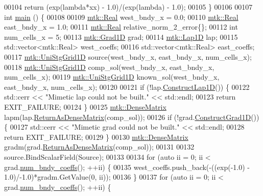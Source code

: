 \begin{DoxyCode}
00104   \textcolor{keywordflow}{return} (exp(lambda*xx) - 1.0)/(exp(lambda) - 1.0);
00105 \}
00106 
00107 \textcolor{keywordtype}{int} \hyperlink{minimalistic__poisson__1d_8cc_ae66f6b31b5ad750f1fe042a706a4e3d4}{main} () \{
00108 
00109   \hyperlink{group__c01-roots_gac080bbbf5cbb5502c9f00405f894857d}{mtk::Real} west\_bndy\_x = 0.0;
00110   \hyperlink{group__c01-roots_gac080bbbf5cbb5502c9f00405f894857d}{mtk::Real} east\_bndy\_x = 1.0;
00111   \hyperlink{group__c01-roots_gac080bbbf5cbb5502c9f00405f894857d}{mtk::Real} relative\_norm\_2\_error\{\};
00112   \textcolor{keywordtype}{int} num\_cells\_x = 5;
00113   \hyperlink{classmtk_1_1Grad1D}{mtk::Grad1D} grad;
00114   \hyperlink{classmtk_1_1Lap1D}{mtk::Lap1D} lap;
00115   std::vector<mtk::Real> west\_coeffs;
00116   std::vector<mtk::Real> east\_coeffs;
00117   \hyperlink{classmtk_1_1UniStgGrid1D}{mtk::UniStgGrid1D} source(west\_bndy\_x, east\_bndy\_x, num\_cells\_x);
00118   \hyperlink{classmtk_1_1UniStgGrid1D}{mtk::UniStgGrid1D} comp\_sol(west\_bndy\_x, east\_bndy\_x, num\_cells\_x);
00119   \hyperlink{classmtk_1_1UniStgGrid1D}{mtk::UniStgGrid1D} known\_sol(west\_bndy\_x, east\_bndy\_x, num\_cells\_x);
00120 
00121   \textcolor{keywordflow}{if} (!lap.\hyperlink{classmtk_1_1Lap1D_a685dcba88c08cf5b7b6c2aa4669a472c}{ConstructLap1D}()) \{
00122     std::cerr << \textcolor{stringliteral}{"Mimetic lap could not be built."} << std::endl;
00123     \textcolor{keywordflow}{return} EXIT\_FAILURE;
00124   \}
00125   \hyperlink{classmtk_1_1DenseMatrix}{mtk::DenseMatrix} lapm(lap.\hyperlink{classmtk_1_1Lap1D_aaea34a17b0879e05eb4109645a2ba8f4}{ReturnAsDenseMatrix}(comp\_sol));
00126   \textcolor{keywordflow}{if} (!grad.\hyperlink{classmtk_1_1Grad1D_a74ef5245cfae6fd158bd7f563a0c2e52}{ConstructGrad1D}()) \{
00127     std::cerr << \textcolor{stringliteral}{"Mimetic grad could not be built."} << std::endl;
00128     \textcolor{keywordflow}{return} EXIT\_FAILURE;
00129   \}
00130   \hyperlink{classmtk_1_1DenseMatrix}{mtk::DenseMatrix} gradm(grad.\hyperlink{classmtk_1_1Grad1D_a77b2eddbe4ab03f469306c604d505b1a}{ReturnAsDenseMatrix}(comp\_sol));
00131 
00132   source.BindScalarField(Source);
00133 
00134   \textcolor{keywordflow}{for} (\textcolor{keyword}{auto} ii = 0; ii < grad.\hyperlink{classmtk_1_1Grad1D_a7168205c21ba00012558f8bba069c119}{num\_bndy\_coeffs}(); ++ii) \{
00135     west\_coeffs.push\_back(-((exp(-1.0) - 1.0)/-1.0)*gradm.GetValue(0, ii));
00136   \}
00137   \textcolor{keywordflow}{for} (\textcolor{keyword}{auto} ii = 0; ii < grad.\hyperlink{classmtk_1_1Grad1D_a7168205c21ba00012558f8bba069c119}{num\_bndy\_coeffs}(); ++ii) \{

\end{DoxyCode}
